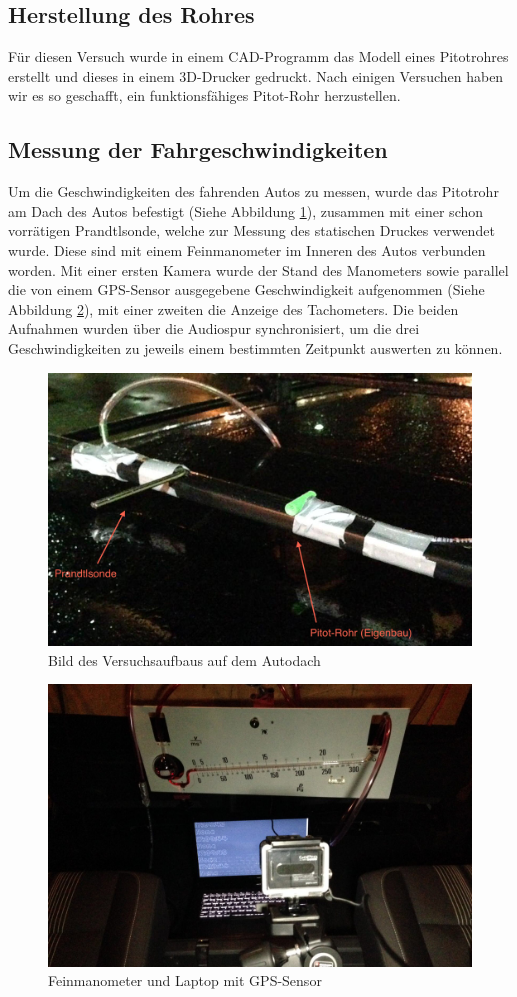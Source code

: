 \subsection{Herstellung des Rohres}
Für diesen Versuch wurde in einem CAD-Programm das Modell eines Pitotrohres erstellt und dieses in einem 3D-Drucker gedruckt. Nach einigen Versuchen haben wir es so geschafft, ein funktionsfähiges Pitot-Rohr herzustellen.

\subsection{Messung der Fahrgeschwindigkeiten}
Um die Geschwindigkeiten des fahrenden Autos zu messen, wurde das Pitotrohr am Dach des Autos befestigt (Siehe Abbildung \ref{rohre}), zusammen mit einer schon vorrätigen Prandtlsonde, welche zur Messung des statischen Druckes verwendet wurde. Diese sind mit einem Feinmanometer im Inneren des Autos verbunden worden. Mit einer ersten Kamera wurde der Stand des Manometers sowie parallel die von einem GPS-Sensor ausgegebene Geschwindigkeit aufgenommen (Siehe Abbildung \ref{messung}), mit einer zweiten die Anzeige des Tachometers. Die beiden Aufnahmen wurden über die Audiospur synchronisiert, um die drei Geschwindigkeiten zu jeweils einem bestimmten Zeitpunkt auswerten zu können.

\begin{figure}
\centering
	\includegraphics[width=.8\textwidth]{images/rohre-kommentiert.png}
	\caption{Bild des Versuchsaufbaus auf dem Autodach}
	\label{rohre}
\end{figure}

\begin{figure}
\centering
	\includegraphics[width=.8\textwidth]{images/messung.jpg}
	\caption{Feinmanometer und Laptop mit GPS-Sensor}
	\label{messung}
\end{figure}

